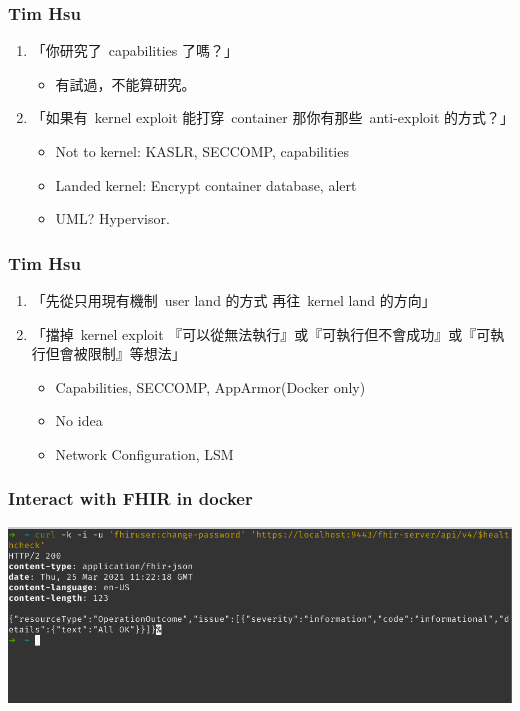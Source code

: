 \documentclass{beamer}
\begin{document}
\begin{CJK*}{UTF8}{bsmi}
    \begin{frame}
        \frametitle{Tim Hsu}
        \begin{enumerate}
            \item 「你研究了\ capabilities 了嗎？」
                  \begin{itemize}
                      \item 有試過，不能算研究。
                  \end{itemize}
            \item 「如果有\ kernel exploit 能打穿\ container 那你有那些\ anti-exploit  的方式？」
                  \begin{itemize}
                      \item Not to kernel: KASLR, SECCOMP, capabilities
                      \item Landed kernel: Encrypt container database, alert
                      \item UML? Hypervisor.
                  \end{itemize}
        \end{enumerate}
    \end{frame}

    \begin{frame}
        \frametitle{Tim Hsu}
        \begin{enumerate}
            \item 「先從只用現有機制\ user land 的方式 再往\ kernel land 的方向」
            \item 「擋掉\ kernel exploit 『可以從無法執行』或『可執行但不會成功』或『可執行但會被限制』等想法」
                  \begin{itemize}
                      \item Capabilities, SECCOMP, AppArmor(Docker only)
                      \item No idea
                      \item Network Configuration, LSM
                  \end{itemize}
        \end{enumerate}
    \end{frame}

    \begin{frame}
        \frametitle{Interact with FHIR in docker}
        \centering
        \includegraphics[width=\textwidth]{Screenshot_2021-03-25_19-22-39.png}
    \end{frame}


\end{CJK*}
\end{document}
